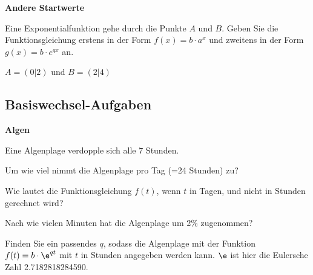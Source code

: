 \platzFuerBerechnungenBisEndeSeite{}



\bbwActAufgabenNr{} \textbf{Andere Startwerte}

Eine Exponentialfunktion gehe durch die Punkte $A$ und $B$. Geben Sie
die Funktionsgleichung erstens in der Form $f(x)=b\cdot{} a^x$ und
zweitens in der Form $g(x)=b\cdot{} e^{qx}$ an.

\begin{bbwAufgabenBlock}
\item $A=(0|2)$ und $B=(2|4)$
\end{bbwAufgabenBlock}


\platzFuerBerechnungenBisEndeSeite{}




\subsection{Basiswechsel-Aufgaben}


\bbwActAufgabenNr{} \textbf{Algen}

Eine Algenplage verdopple sich alle 7 Stunden.

\begin{bbwAufgabenBlock}

\item Um wie viel nimmt die Algenplage pro Tag (=24 Stunden) zu?



\item Wie lautet die Funktionsgleichung $f(t)$, wenn $t$ in Tagen, und nicht in Stunden gerechnet wird?


\item Nach wie vielen Minuten hat die Algenplage um 2\% zugenommen?


\item Finden Sie ein passendes $q$, sodass die Algenplage mit der Funktion $f(t) = b\cdot{}\e^{qt}$ mit $t$ in Stunden angegeben werden kann. $\e$ ist hier die Eulersche Zahl 2.7182818284590.



\end{bbwAufgabenBlock}


\platzFuerBerechnungenBisEndeSeite{}

\newpage
